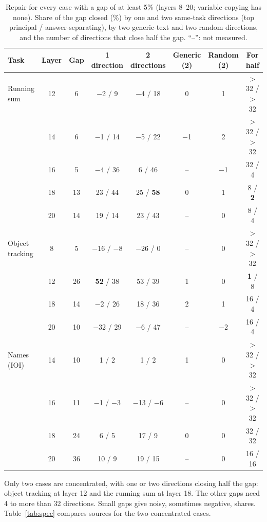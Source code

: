 \documentclass[11pt,a4paper]{article}
\begin{document}
\begin{table}[H]
\centering\small
\caption{Repair for every case with a gap of at least 5\% (layers 8--20; variable copying has none). Share of the gap
  closed (\%) by one and two same-task directions (top principal / answer-separating), by two generic-text and two
  random directions, and the number of directions that close half the gap. ``--'': not measured.}
\label{tab:repair}
\begin{tabular}{@{}l c c c c c c c@{}}
\toprule
Task & Layer & Gap & 1 direction & 2 directions & Generic (2) & Random (2) & For half \\
\midrule
Running sum & 12 & 6 & $-$2 / 9 & $-$4 / 18 & 0 & 1 & $>$32 / $>$32 \\
 & 14 & 6 & $-$1 / 14 & $-$5 / 22 & $-$1 & 2 & $>$32 / $>$32 \\
 & 16 & 5 & $-$4 / 36 & 6 / 46 & -- & $-$1 & 32 / 4 \\
 & 18 & 13 & 23 / 44 & 25 / \textbf{58} & 0 & 1 & 8 / \textbf{2} \\
 & 20 & 14 & 19 / 14 & 23 / 43 & -- & 0 & 8 / 4 \\
\midrule
Object tracking & 8 & 5 & $-$16 / $-$8 & $-$26 / 0 & -- & 0 & $>$32 / $>$32 \\
 & 12 & 26 & \textbf{52} / 38 & 53 / 39 & 1 & 0 & \textbf{1} / 8 \\
 & 18 & 14 & $-$2 / 26 & 18 / 36 & 2 & 1 & 16 / 4 \\
 & 20 & 10 & $-$32 / 29 & $-$6 / 47 & -- & $-$2 & 16 / 4 \\
\midrule
Names (IOI) & 14 & 10 & 1 / 2 & 1 / 2 & 1 & 0 & $>$32 / $>$32 \\
 & 16 & 11 & $-$1 / $-$3 & $-$13 / $-$6 & -- & 0 & $>$32 / $>$32 \\
 & 18 & 24 & 6 / 5 & 17 / 9 & 0 & 0 & 32 / 32 \\
 & 20 & 36 & 10 / 9 & 19 / 15 & -- & 0 & 16 / 16 \\
\bottomrule
\end{tabular}
\end{table}

Only two cases are concentrated, with one or two directions closing half the gap: object tracking at layer 12 and the
running sum at layer 18. The other gaps need 4 to more than 32 directions. Small gaps give noisy, sometimes negative,
shares. Table~\ref{tab:spec} compares sources for the two concentrated cases.
\end{document}
